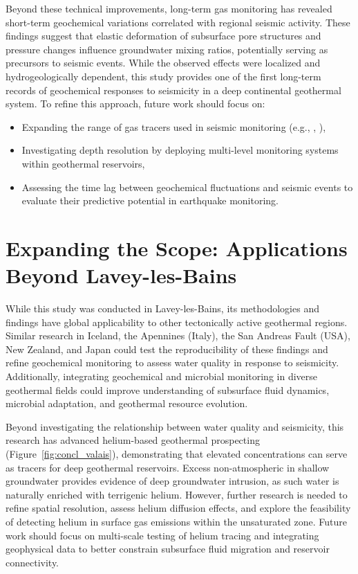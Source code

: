 Beyond these technical improvements, long-term gas monitoring has revealed short-term geochemical variations correlated with regional seismic activity.
These findings suggest that elastic deformation of subsurface pore structures and pressure changes influence groundwater mixing ratios, potentially serving as precursors to seismic events.
While the observed effects were localized and hydrogeologically dependent, this study provides one of the first long-term records of geochemical responses to seismicity in a deep continental geothermal system.
To refine this approach, future work should focus on:

\begin{itemize}
    \item Expanding the range of gas tracers used in seismic monitoring (e.g., , ),
    \item Investigating depth resolution by deploying multi-level monitoring systems within geothermal reservoirs,
    \item Assessing the time lag between geochemical fluctuations and seismic events to evaluate their predictive potential in earthquake monitoring.
\end{itemize}

\section*{Expanding the Scope: Applications Beyond Lavey-les-Bains}
While this study was conducted in Lavey-les-Bains, its methodologies and findings have global applicability to other tectonically active geothermal regions.
Similar research in Iceland, the Apennines (Italy), the San Andreas Fault (USA), New Zealand, and Japan could test the reproducibility of these findings and refine geochemical monitoring to assess water quality in response to seismicity.
Additionally, integrating geochemical and microbial monitoring in diverse geothermal fields could improve understanding of subsurface fluid dynamics, microbial adaptation, and geothermal resource evolution.

Beyond investigating the relationship between water quality and seismicity, this research has advanced helium-based geothermal prospecting (Figure~\ref{fig:concl_valais}), demonstrating that elevated  concentrations can serve as tracers for deep geothermal reservoirs. 
Excess non-atmospheric  in shallow groundwater provides evidence of deep groundwater intrusion, as such water is naturally enriched with terrigenic helium.
However, further research is needed to refine spatial resolution, assess helium diffusion effects, and explore the feasibility of detecting helium in surface gas emissions within the unsaturated zone.
Future work should focus on multi-scale testing of helium tracing and integrating geophysical data to better constrain subsurface fluid migration and reservoir connectivity.

